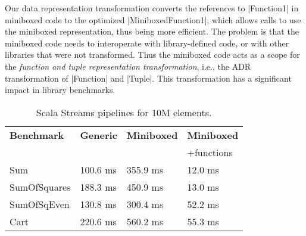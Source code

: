 
Our data representation transformation converts the references to
|Function1| in miniboxed code to the optimized |MiniboxedFunction1|,
which allows calls to use the miniboxed representation, thus being more efficient. The
problem is that the miniboxed code needs to interoperate with
library-defined code, or with other libraries that were not
transformed. Thus the miniboxed code acts
as a scope for the \emph{function and tuple representation
  transformation}, i.e., the ADR transformation of |Function| and
|Tuple|.
This transformation has a significant impact in library benchmarks.

\begin{table}[t]
  \begin{tabularx}{0.48\textwidth}{|g *{3}{|Y}|} \hline
    \textbf{Benchmark} & \textbf{Generic} & \textbf{Miniboxed}& \textbf{Miniboxed} \\
                       &                  &                   & +functions \\ \hline
    Sum              &              100.6 ms &              355.9 ms &             12.0 ms \\
    SumOfSquares     &              188.3 ms &              450.9 ms &             13.0 ms \\
    SumOfSqEven      &              130.8 ms &              300.4 ms &             52.2 ms \\
    Cart             &              220.6 ms &              560.2 ms &             55.3 ms \\ \hline
  \end{tabularx}
  \vspace{-2mm}
  \caption{Scala Streams pipelines for 10M elements.}
  \label{table:streams}
  \vspace{-1em}
\end{table}


